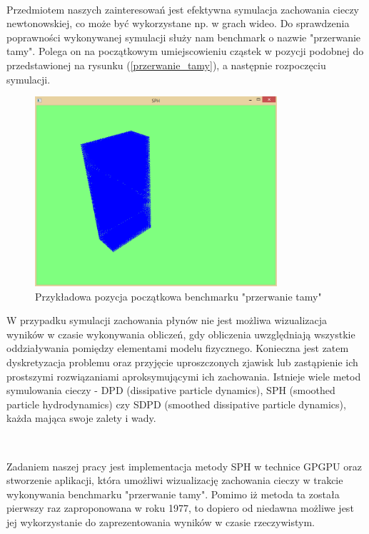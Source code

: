 \documentclass[polish, 12pt]{aghthesis}
\begin{document}
	$\,$

	Przedmiotem naszych zainteresowań jest efektywna symulacja zachowania cieczy newtonowskiej, co może być wykorzystane np. w grach wideo. Do sprawdzenia poprawności wykonywanej symulacji służy nam benchmark o nazwie "przerwanie tamy". Polega on na początkowym umiejscowieniu cząstek w pozycji podobnej do przedstawionej na rysunku (\ref{przerwanie_tamy}), a następnie rozpoczęciu symulacji. 
	
	\begin{figure}[h!]
	\centering
		\includegraphics[width=0.8\textwidth]{starting_position.png}
		\caption{Przykładowa pozycja początkowa benchmarku "przerwanie tamy"}
		\label{img:przerwanie_tamy}
	\end{figure}
	
	W przypadku symulacji zachowania płynów nie jest możliwa wizualizacja wyników w czasie wykonywania obliczeń, gdy obliczenia uwzględniają wszystkie oddziaływania pomiędzy elementami modelu fizycznego. Konieczna jest zatem dyskretyzacja problemu oraz przyjęcie uproszczonych zjawisk lub zastąpienie ich prostszymi rozwiązaniami aproksymującymi ich zachowania. Istnieje wiele metod symulowania cieczy - DPD (dissipative particle dynamics), SPH (smoothed particle hydrodynamics) czy SDPD (smoothed dissipative particle dynamics), każda mająca swoje zalety i wady.
	
	$\,$

	Zadaniem naszej pracy jest implementacja metody SPH w technice GPGPU oraz stworzenie aplikacji, która umożliwi wizualizację zachowania cieczy w trakcie wykonywania benchmarku "przerwanie tamy". Pomimo iż metoda ta została pierwszy raz zaproponowana w roku 1977, to dopiero od niedawna możliwe jest jej wykorzystanie do zaprezentowania wyników w czasie rzeczywistym.
\end{document}
